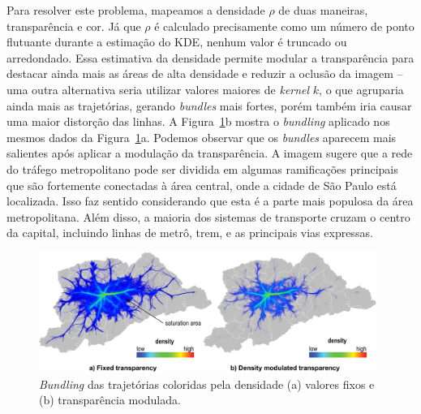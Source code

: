 Para resolver este problema, mapeamos a densidade $\rho$ de duas maneiras,
transparência e cor. Já que $\rho$ é calculado precisamente como um número
de ponto flutuante durante a estimação do KDE, nenhum valor é truncado ou arredondado.
Essa estimativa da densidade permite modular a transparência para destacar ainda
mais as áreas de alta densidade e reduzir a oclusão da imagem -- uma outra alternativa
seria utilizar valores maiores de \emph{kernel} $k$, o que agruparia ainda mais as trajetórias, gerando
\emph{bundles} mais fortes, porém também iria causar uma maior distorção das linhas.
A Figura~\ref{fig:bundled-graph-density}b mostra o \emph{bundling} aplicado nos mesmos
dados da Figura~\ref{fig:bundled-graph-density}a. Podemos observar que os \emph{bundles}
aparecem mais salientes após aplicar a modulação da transparência. A imagem sugere que a rede do tráfego metropolitano
pode ser dividida em algumas ramificações principais que são fortemente conectadas à área central,
onde a cidade de São Paulo está localizada. Isso faz sentido considerando que esta é a parte
mais populosa da área metropolitana. Além disso, a maioria dos sistemas de transporte
cruzam o centro da capital, incluindo linhas de metrô, trem, e as principais vias expressas.

\begin{figure}[!htb]
  \centering
  \captionsetup{justification=centering}
  \includegraphics[width=0.98\textwidth]{../figuras/figure1}
  \caption{\emph{Bundling} das trajetórias coloridas pela densidade (a) valores fixos e \\(b) transparência modulada.}
  \label{fig:bundled-graph-density}  
\end{figure}

